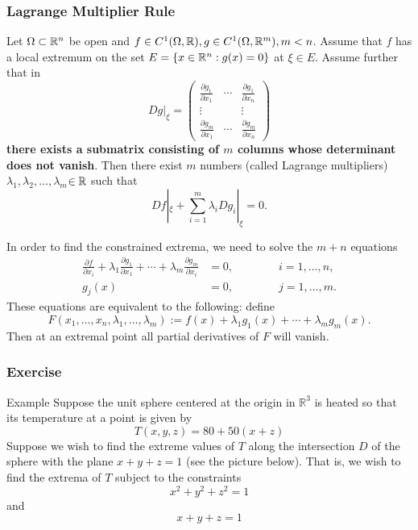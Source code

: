 \documentclass[11pt, t]{beamer}
\newcommand{\myseries}[2]{$#1_1,#1_2,\dots,#1_#2$}
\begin{document}
\begin{frame}[allowframebreaks]
    \frametitle{Lagrange Multiplier Rule}

    Let $\Omega\subset\mathbb{R}^n$ be open and $f\in C^1(\Omega,\mathbb{R}),g\in C^1(\Omega,\mathbb{R}^m),m<n$. Assume that $f$ has a local extremum on the set $E=\{x\in\mathbb{R}^n:g(x)=0\}$ at $\xi\in E$. Assume further that in
    \[Dg|_\xi=\begin{pmatrix}
            \frac{\partial g_1}{\partial x_1} & \cdots & \frac{\partial g_1}{\partial x_n} \\
            \vdots                            &        & \vdots                            \\
            \frac{\partial g_m}{\partial x_1} & \cdots & \frac{\partial g_m}{\partial x_n}
        \end{pmatrix}\]
    \textbf{there exists a submatrix consisting of $m$ columns whose determinant does
        not vanish}. Then there exist $m$ numbers (called Lagrange multipliers) \myseries{\lambda}{m}$\in\mathbb{R}$ such that
    \begin{equation}\label{2.7.4}
        Df|_\xi+\sum_{i=1}^{m}\lambda_i Dg_i|_\xi=0.
    \end{equation}

    In order to find the constrained extrema, we need to solve the $m + n$ equations
    \begin{align*}
        \frac{\partial f}{\partial x_i}+\lambda_1\frac{\partial g_1}{\partial x_1}+\cdots+\lambda_m\frac{\partial g_m}{\partial x_i} & =0,\qquad\qquad i=1,\ldots,n, \\
        g_j(x)                                                                                                                       & =0,\qquad\qquad j=1,\ldots,m.
    \end{align*}
    These equations are equivalent to the following: define
    \[F(x_1,\ldots,x_n,\lambda_1,\ldots,\lambda_m)
        :=f(x)+\lambda_1g_1(x)+\cdots+\lambda_mg_m(x).\]
    Then at an extremal point all partial derivatives of $F$ will vanish.
\end{frame}

\begin{frame}
    \frametitle{Exercise}
    Example Suppose the unit sphere centered at the origin in $\mathbb{R}^{3}$ is heated so that its temperature at a point is given by
    \[
        T(x, y, z)=80+50(x+z)
    \]
    Suppose we wish to find the extreme values of $T$ along the intersection $D$ of the sphere with the plane $x+y+z=1$ (see the picture below). That is, we wish to find the extrema of $T$ subject to the constraints
    \[
        x^{2}+y^{2}+z^{2}=1
    \]
    and
    \[
        x+y+z=1
    \]

\end{frame}
\end{document}
